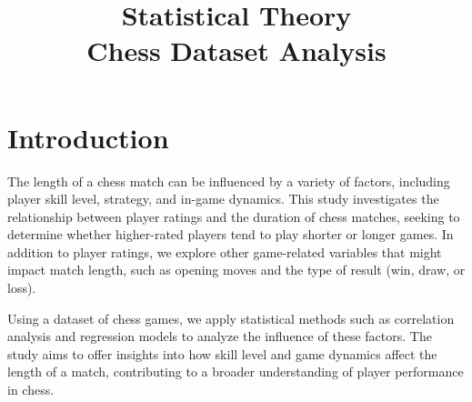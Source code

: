 \documentclass[conference]{IEEEtran}
\title{
Statistical Theory\\
Chess Dataset Analysis
}
\author{
   \IEEEauthorblockN{Dor Boker, Itamar Nakar}
   \IEEEauthorblockA{
      I.D: , 325829000\\
      Email: , itamar.nakar@gmail.com
   }
}
\begin{document}
\maketitle

\section{Introduction}
The length of a chess match can be influenced by a variety of factors, including player skill level, strategy, and in-game dynamics. This study investigates the relationship between player ratings and the duration of chess matches, seeking to determine whether higher-rated players tend to play shorter or longer games. In addition to player ratings, we explore other game-related variables that might impact match length, such as opening moves and the type of result (win, draw, or loss).

Using a dataset of chess games, we apply statistical methods such as correlation analysis and regression models to analyze the influence of these factors. The study aims to offer insights into how skill level and game dynamics affect the length of a match, contributing to a broader understanding of player performance in chess.
\end{document}
